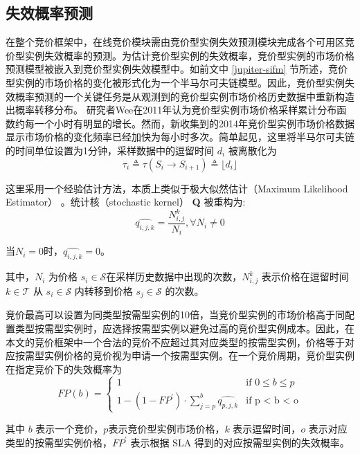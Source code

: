 \subsection{失效概率预测}
在整个竞价框架中，在线竞价模块需由竞价型实例失效预测模块完成各个可用区竞价型实例失效概率的预测。为估计竞价型实例的失效概率，竞价型实例的市场价格预测模型被嵌入到竞价型实例失效模型中。如前文中 \ref{jupiter-sifm} 节所述，竞价型实例的市场价格的变化被形式化为一个半马尔可夫链模型。因此，竞价型实例失效概率预测的一个关键任务是从观测到的竞价型实例市场价格历史数据中重新构造出概率转移分布。
研究者Wee\cite{5948651}在2011年认为竞价型实例市场价格采样累计分布函数约每一个小时有明显的增长。然而，新收集到的2014年竞价型实例市场价格数据显示市场价格的变化频率已经加快为每小时多次。简单起见，这里将半马尔可夫链的时间单位设置为1分钟，采样数据中的逗留时间 $d_i$ 被离散化为
\begin{equation}
\tau_i \triangleq \tau(S_i \rightarrow S_{i+1}) \triangleq \lfloor d_i \rfloor
\end{equation}

这里采用一个经验估计方法，本质上类似于极大似然估计（Maximum Likelihood Estimator） \cite{Barbu:2008:SCH:1481376}。统计核（stochastic kernel） \textbf{Q} 被重构为:
\begin{equation}
\widehat{{q}_{i,j,k}} = \frac{N_{i, j}^{k}}{N_i}, \forall N_i \neq 0
\end{equation}

当$N_i = 0$时，$\widehat{{q}_{i,j,k}} = 0$。

其中，$N_i$ 为价格 $s_i \in \mathcal{S}$在采样历史数据中出现的次数，$N_{i, j}^{k}$ 表示价格在逗留时间 $k \in \mathcal{T}$ 从 $s_i \in \mathcal{S}$ 内转移到价格 $s_j \in \mathcal{S}$ 的次数。

竞价最高可以设置为同类型按需型实例的10倍，当竞价型实例的市场价格高于同配置类型按需型实例时，应选择按需型实例以避免过高的竞价型实例成本。因此，在本文的竞价框架中一个合法的竞价不应超过其对应类型的按需型实例，价格等于对应按需型实例价格的竞价视为申请一个按需型实例。在一个竞价周期，竞价型实例在指定竞价下的失效概率为
\begin{equation}
FP(b) = 
\begin{cases}
1 &\mbox{if $0 \leq b \leq p$}\\
1 - (1 - FP^{\prime}) \cdot \sum\limits_{j=p}^b{\widehat{{q}_{p, j, k}}} &\mbox{if p < b < o}
\end{cases}
\end{equation}

其中 $b$ 表示一个竞价，$p$表示竞价型实例市场价格，$k$ 表示逗留时间，$o$ 表示对应类型的按需型实例价格，$FP^{\prime}$ 表示根据 SLA 得到的对应按需型实例的失效概率。

